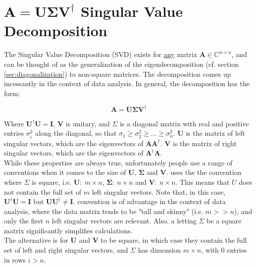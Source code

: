 \section{$\mathbf{A} = \mathbf{U\Sigma V}^{\dagger}$ Singular Value Decomposition}
\label{sec:svd}

The Singular Value Decomposition (SVD) exists for \underline{any} matrix $\mathbf{A}\in\mathbb{C}^{m\times n}$, and can be thought of as the generalization of the eigendecomposition (cf. section \ref{sec:diagonalization}) to non-square matrices. The decomposition comes up incessantly in the context of data analysis. In general, the decomposition has the form:

\begin{equation}
\mathbf{A} = \mathbf{U\Sigma V^{\dagger}}
\end{equation}

Where $\mathbf{U^{\dagger}}\mathbf{U} = \mathbf{I}$, $\mathbf{V}$ is unitary, and $\Sigma$ is a diagonal matrix with real and positive entries $\sigma_i^2$ along the diagonal, so that $\sigma_1 \geq \sigma^2_2 \geq ...\geq \sigma^2_n$. $\mathbf{U}$ is the matrix of left singular vectors, which are the eigenvectors of $\mathbf{A A^{\dagger}}$. $\mathbf{V}$ is the matrix of right singular vectors, which are the eigenvectors of $\mathbf{A^{\dagger} A}$. 
\\

While these properties are always true, unfortunately people use a range of conventions when it comes to the size of $\mathbf{U}$, $\mathbf{\Sigma}$ and $\mathbf{V}$.  uses the the convention where $\Sigma$ is square, i.e. $\mathbf{U}:\ m\times n$, $\mathbf{\Sigma}:\ n\times n$ and $\mathbf{V}:\ n\times n$. This means that $U$ does not contain the full set of $m$ left singular vectors. Note that, in this case, $\mathbf{U^{\dagger}}\mathbf{U} = \mathbf{I}$ but $\mathbf{U}\mathbf{U^{\dagger}} \neq \mathbf{I}$.  convention is of advantage in the context of data analysis, where the data matrix tends to be "tall and skinny" (i.e. $m>>n$), and only the first $n$ left singular vectors are relevant. Also, a letting $\Sigma$ be a square matrix significantly simplifies calculations.  
\\

The alternative is for $\mathbf{U}$ and $\mathbf{V}$ to be square, in which case they contain the full set of left and right singular vectors, and $\Sigma$ has dimension $m\times n$, with $0$ entries in rows $i>n$.